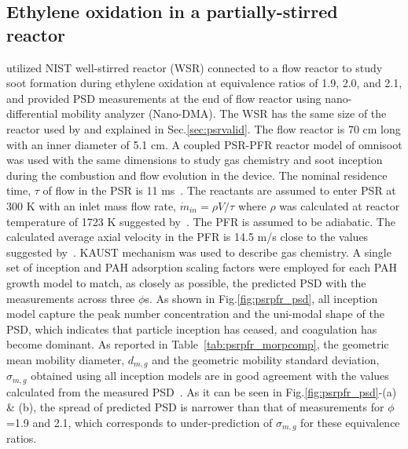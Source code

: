 \subsection{Ethylene oxidation in a partially-stirred reactor}

\citet{manzello2007soot} utilized NIST well-stirred reactor (WSR) connected to a flow reactor to study soot formation during ethylene oxidation at equivalence ratios of 1.9, 2.0, and 2.1, and provided PSD measurements at the end of flow reactor using nano-differential mobility analyzer (Nano-DMA). The WSR has the same size of the reactor used by \citet{manzello2007soot} and explained in Sec.\ref{sec:psrvalid}. The flow reactor is 70 cm long with an inner diameter of 5.1 cm. A coupled PSR-PFR reactor model of omnisoot was used with the same dimensions to study gas chemistry and soot inception during the combustion and flow evolution in the device. The nominal residence time, $\tau$ of flow in the PSR is 11 ms~\citet{manzello2007soot}. The reactants are assumed to enter PSR at 300 K with an inlet mass flow rate, $\dot{m}_{in}=\rho V / \tau$ where $\rho$ was calculated at reactor temperature of 1723 K suggested by~\citet{lenhert2009effects}. The PFR is assumed to be adiabatic. The calculated average axial velocity in the PFR is 14.5 m/s close to the values suggested by~\citet{manzello2007soot}. KAUST mechanism was used to describe gas chemistry. A single set of inception and PAH adsorption scaling factors were employed for each PAH growth model to match, as closely as possible, the predicted PSD with the measurements across three $\phi$s. As shown in Fig.\ref{fig:psrpfr_psd}, all inception model capture the peak number concentration and the uni-modal shape of the PSD, which indicates that particle inception has ceased, and coagulation has become dominant.  As reported in Table~\ref{tab:psrpfr_morpcomp}, the geometric mean mobility diameter, $d_{m,g}$ and the geometric mobility standard deviation, $\sigma_{m,g}$ obtained using all inception models are in good agreement with the values calculated from the measured PSD~\citep{manzello2007soot}. As it can be seen in Fig.\ref{fig:psrpfr_psd}-(a) \& (b), the spread of predicted PSD is narrower than that of measurements for $\phi$=1.9 and 2.1, which corresponds to under-prediction of $\sigma_{m,g}$ for these equivalence ratios.


